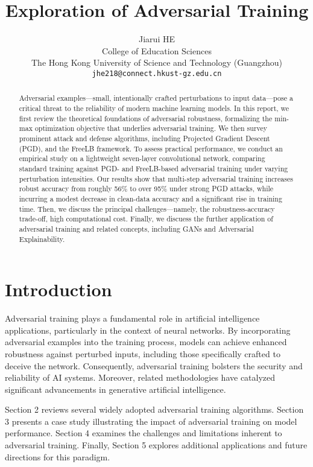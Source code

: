 \documentclass[10pt,twocolumn,letterpaper]{article}
\title{Exploration of Adversarial Training}
\author{Jiarui HE\\
College of Education Sciences \\
The Hong Kong University of Science and Technology (Guangzhou) \\
{\tt\small jhe218@connect.hkust-gz.edu.cn}
}
\begin{document}
\maketitle

\begin{abstract}
Adversarial examples—small, intentionally crafted perturbations to input data—pose a critical threat to the reliability of modern machine learning models. In this report, we first review the theoretical foundations of adversarial robustness, formalizing the min-max optimization objective that underlies adversarial training. We then survey prominent attack and defense algorithms, including Projected Gradient Descent (PGD), and the FreeLB framework. To assess practical performance, we conduct an empirical study on a lightweight seven-layer convolutional network, comparing standard training against PGD- and FreeLB-based adversarial training under varying perturbation intensities. Our results show that multi-step adversarial training increases robust accuracy from roughly 56\% to over 95\% under strong PGD attacks, while incurring a modest decrease in clean-data accuracy and a significant rise in training time. Then, we discuss the principal challenges—namely, the robustness-accuracy trade-off, high computational cost. Finally, we discuess the further application of adversarial training and related concepts, including GANs and Adversarial Explainability.
\end{abstract}

\section{Introduction}

Adversarial training plays a fundamental role in artificial intelligence applications, particularly in the context of neural networks. By incorporating adversarial examples into the training process, models can achieve enhanced robustness against perturbed inputs, including those specifically crafted to deceive the network. Consequently, adversarial training bolsters the security and reliability of AI systems. Moreover, related methodologies have catalyzed significant advancements in generative artificial intelligence.

Section 2 reviews several widely adopted adversarial training algorithms. Section 3 presents a case study illustrating the impact of adversarial training on model performance. Section 4 examines the challenges and limitations inherent to adversarial training. Finally, Section 5 explores additional applications and future directions for this paradigm.
\end{document}
